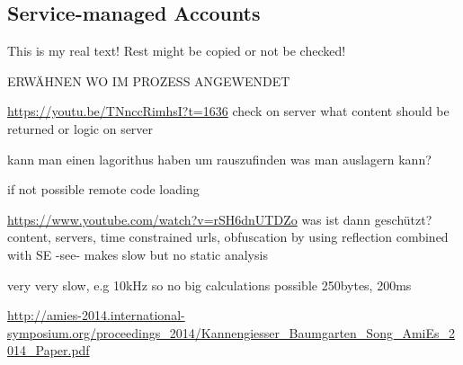 \subsection{Service-managed Accounts} \label{subsection:external-service}
This is my real text! Rest might be copied or not be checked!

ERWÄHNEN WO IM PROZESS ANGEWENDET\newline


\url{https://youtu.be/TNnccRimhsI?t=1636}\newline
check on server what content should be returned or logic on server\newline

kann man einen lagorithus haben um rauszufinden was man auslagern kann?\newline

if not possible remote code loading\newline

\url{https://www.youtube.com/watch?v=rSH6dnUTDZo}
was ist dann geschützt? content, servers, time constrained urls, obfuscation by using reflection combined with SE -see- makes slow but no static analysis\newline

very very slow, e.g 10kHz so no big calculations possible\newline
250bytes, 200ms \newline

\url{http://amies-2014.international-symposium.org/proceedings_2014/Kannengiesser_Baumgarten_Song_AmiEs_2014_Paper.pdf}\newline
